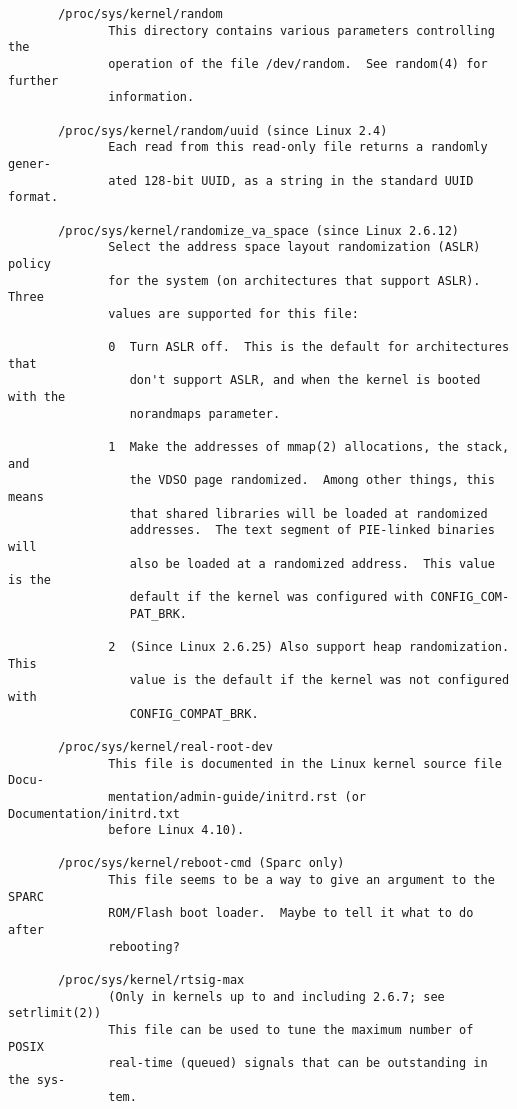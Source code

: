 \documentclass[]{article}
\begin{document}
\begin{verbatim}
       /proc/sys/kernel/random
              This directory contains various parameters controlling the
              operation of the file /dev/random.  See random(4) for further
              information.

       /proc/sys/kernel/random/uuid (since Linux 2.4)
              Each read from this read-only file returns a randomly gener‐
              ated 128-bit UUID, as a string in the standard UUID format.

       /proc/sys/kernel/randomize_va_space (since Linux 2.6.12)
              Select the address space layout randomization (ASLR) policy
              for the system (on architectures that support ASLR).  Three
              values are supported for this file:

              0  Turn ASLR off.  This is the default for architectures that
                 don't support ASLR, and when the kernel is booted with the
                 norandmaps parameter.

              1  Make the addresses of mmap(2) allocations, the stack, and
                 the VDSO page randomized.  Among other things, this means
                 that shared libraries will be loaded at randomized
                 addresses.  The text segment of PIE-linked binaries will
                 also be loaded at a randomized address.  This value is the
                 default if the kernel was configured with CONFIG_COM‐
                 PAT_BRK.

              2  (Since Linux 2.6.25) Also support heap randomization.  This
                 value is the default if the kernel was not configured with
                 CONFIG_COMPAT_BRK.

       /proc/sys/kernel/real-root-dev
              This file is documented in the Linux kernel source file Docu‐
              mentation/admin-guide/initrd.rst (or Documentation/initrd.txt
              before Linux 4.10).

       /proc/sys/kernel/reboot-cmd (Sparc only)
              This file seems to be a way to give an argument to the SPARC
              ROM/Flash boot loader.  Maybe to tell it what to do after
              rebooting?

       /proc/sys/kernel/rtsig-max
              (Only in kernels up to and including 2.6.7; see setrlimit(2))
              This file can be used to tune the maximum number of POSIX
              real-time (queued) signals that can be outstanding in the sys‐
              tem.


\end{verbatim}
\end{document}
